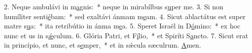 2. Neque ambulávi in m\uline{a}gnis:~* neque in mirabílbus s\uline{u}per me.
3. Si non humíliter senti\uline{é}bam:~* sed exaltávi ánmam m\uline{e}am.
4. Sicut ablactátus est super matre s\uline{u}a:~* ita retribútio in ánma m\uline{e}a.
5. Speret Israël in D\uline{ó}mino:~* ex hoc nunc et us in s\uline{ǽ}culum.
6. Glória Patri, et F\uline{í}lio,~* et Spiríti S\uline{a}ncto.
7. Sicut erat in princípio, et nunc, et s\uline{e}mper,~* et in sǽcula sæculrum. \uline{A}men.
